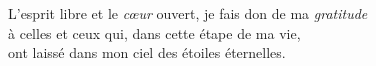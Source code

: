 \begin{center}\begin{tcolorbox}[gratitude]
    L'esprit libre et le \textit{c\oe ur} ouvert, %
    je fais don de ma \textit{gratitude}\\[0.15\baselineskip] %
    à celles et ceux qui, dans cette étape de ma vie, \\[0.15\baselineskip]
    ont laissé dans mon ciel des étoiles éternelles.
\end{tcolorbox}\end{center}%

